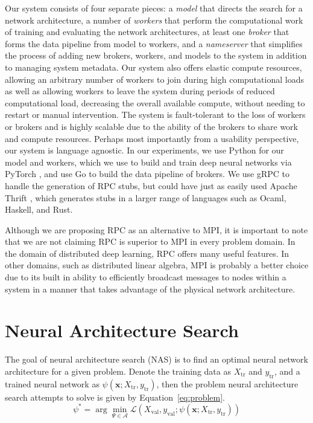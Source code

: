 \documentclass[conference]{IEEEtran}
\begin{document}
Our system consists of four separate pieces: a \emph{model} that directs the
search for a network architecture, a number of \emph{workers} that perform the
computational work of training and evaluating the network architectures, at
least one \emph{broker} that forms the data pipeline from model to workers, and
a \emph{nameserver} that simplifies the process of adding new brokers, workers,
and models to the system in addition to managing system metadata. Our system
also offers elastic compute resources, allowing an arbitrary number of workers
to join during high computational loads as well as allowing workers to leave the
system during periods of reduced computational load, decreasing the overall
available compute, without needing to restart or manual intervention.  The
system is fault-tolerant to the loss of workers or brokers and is highly
scalable due to the ability of the brokers to share work and compute
resources. Perhaps most importantly from a usability perspective, our system is
language agnostic. In our experiments, we use Python for our model and workers,
which we use to build and train deep neural networks via PyTorch
\cite{paszke2017automatic}, and use Go to build the data pipeline of brokers. We
use gRPC \cite{Wang:1993:GCC:155870.155881} to handle the generation of RPC
stubs, but could have just as easily used Apache Thrift \cite{Slee2007}, which
generates stubs in a larger range of languages such as Ocaml, Haskell, and Rust.

Although we are proposing RPC as an alternative to MPI, it is important to note
that we are not claiming RPC is superior to MPI in every problem domain. In the
domain of distributed deep learning, RPC offers many useful features. In other
domains, such as distributed linear algebra, MPI is probably a better choice due
to its built in ability to efficiently broadcast messages to nodes within a
system in a manner that takes advantage of the physical network architecture.

\section{Neural Architecture Search}
The goal of neural architecture search (NAS) is to find an optimal neural
network architecture for a given problem. Denote the training data as
$X_{\text{tr}}$ and $y_{\text{tr}}$, and a trained neural network as
$\psi(\mathbf{x}; X_{\text{tr}}, y_{\text{tr}})$, then the problem
neural architecture search attempts to solve is given by
Equation~\eqref{eq:problem}.
\begin{equation}\label{eq:problem}
\psi^* = \arg\min_{\Psi \in \mathcal{A}} \mathcal{L}(X_{\text{val}}, y_{\text{val}}; \psi(\mathbf{x}; X_{\text{tr}}, y_{\text{tr}}))
\end{equation}
\end{document}
